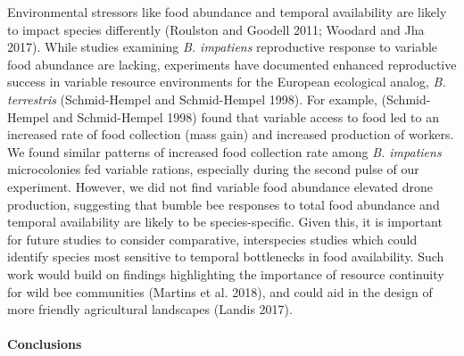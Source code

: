 \documentclass[11pt,]{article}
\let\oldparagraph\paragraph
\renewcommand{\paragraph}[1]{\oldparagraph{#1}\mbox{}}
\begin{document}
Environmental stressors like food abundance and temporal availability
are likely to impact species differently (Roulston and Goodell 2011;
Woodard and Jha 2017). While studies examining \emph{B. impatiens}
reproductive response to variable food abundance are lacking,
experiments have documented enhanced reproductive success in variable
resource environments for the European ecological analog, \emph{B.
terrestris} (Schmid-Hempel and Schmid-Hempel 1998). For example,
(Schmid-Hempel and Schmid-Hempel 1998) found that variable access to
food led to an increased rate of food collection (mass gain) and
increased production of workers. We found similar patterns of increased
food collection rate among \emph{B. impatiens} microcolonies fed
variable rations, especially during the second pulse of our experiment.
However, we did not find variable food abundance elevated drone
production, suggesting that bumble bee responses to total food abundance
and temporal availability are likely to be species-specific. Given this,
it is important for future studies to consider comparative, interspecies
studies which could identify species most sensitive to temporal
bottlenecks in food availability. Such work would build on findings
highlighting the importance of resource continuity for wild bee
communities (Martins et al. 2018), and could aid in the design of more
friendly agricultural landscapes (Landis 2017).

\hypertarget{conclusions}{%
\paragraph{Conclusions}\label{conclusions}}
\end{document}
